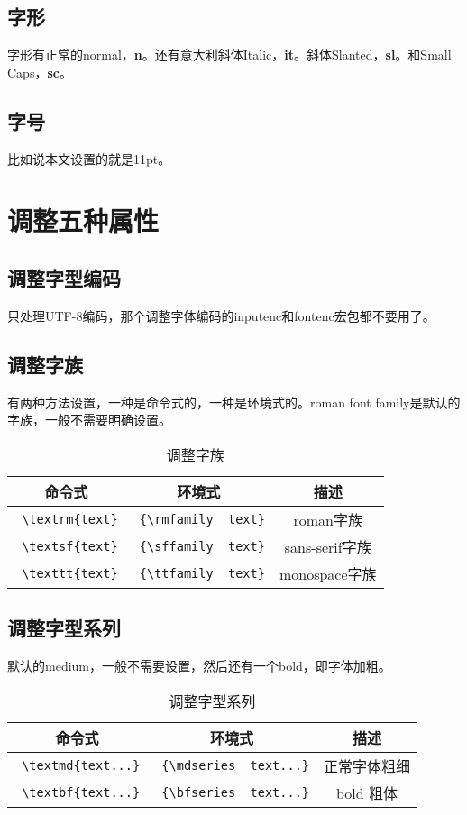 \documentclass[11pt,oneside]{book}
\begin{document}
  \subsection{字形}
  字形有正常的normal，\textbf{n}。还有意大利斜体Italic，\textbf{it}。斜体Slanted，\textbf{sl}。和Small Caps，\textbf{sc}。


  \subsection{字号}
  比如说本文设置的就是11pt。



  \section{调整五种属性}
  \subsection{调整字型编码}
  \XeLaTeX 只处理UTF-8编码，那个调整字体编码的inputenc和fontenc宏包都不要用了。


  \subsection{调整字族}
  有两种方法设置，一种是命令式的，一种是环境式的。roman font family是默认的字族，一般不需要明确设置。
  \begin{table}[H]
    \centering
    \label{tab:调整字族}
    \begin{tabular}{|c|c|c|}
      \hline
      命令式 & 环境式 & 描述 \\
      \hline
      \verb+ \textrm{text}+ & \verb+ {\rmfamily  text}+  & roman字族 \\
      \verb+ \textsf{text}+ & \verb+ {\sffamily  text}+  & sans-serif字族 \\
      \verb+ \texttt{text}+ & \verb+ {\ttfamily  text}+  & monospace字族 \\
      \hline
    \end{tabular}
    \caption{调整字族}
  \end{table}

  \subsection{调整字型系列}
  默认的medium，一般不需要设置，然后还有一个bold，即字体加粗。
  \begin{table}[H]
    \centering
    \label{tab:调整字型系列}
    \begin{tabular}{|c|c|c|}
      \hline
      命令式 & 环境式 & 描述 \\
      \hline
      \verb+ \textmd{text...}+ & \verb+ {\mdseries  text...}+  & 正常字体粗细 \\
      \verb+ \textbf{text...}+ & \verb+ {\bfseries  text...}+  & bold 粗体 \\
      \hline
    \end{tabular}
    \caption{调整字型系列}
  \end{table}
\end{document}
